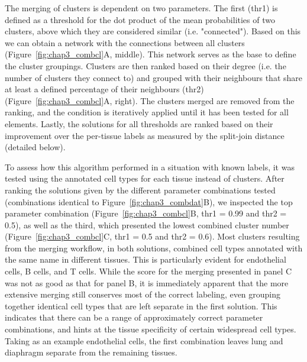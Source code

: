 The merging of clusters is dependent on two parameters. The first (thr1) is defined as a threshold for the dot product of the mean probabilities of two clusters, above which they are considered similar (i.e. "connected"). Based on this we can obtain a network with the connections between all clusters (Figure~\ref{fig:chap3_combcl}A, middle). This network serves as the base to define the cluster groupings. Clusters are then ranked based on their degree (i.e. the number of clusters they connect to) and grouped with their neighbours that share at least a defined percentage of their neighbours (thr2) (Figure~\ref{fig:chap3_combcl}A, right). The clusters merged are removed from the ranking, and the condition is iteratively applied until it has been tested for all elements. Lastly, the solutions for all thresholds are ranked based on their improvement over the per-tissue labels as measured by the split-join distance (detailed below).

To assess how this algorithm performed in a situation with known labels, it was tested using the annotated cell types for each tissue instead of clusters. After ranking the solutions given by the different parameter combinations tested (combinations identical to Figure~\ref{fig:chap3_combdat}B), we inspected the top parameter combination (Figure~\ref{fig:chap3_combcl}B, thr1 = 0.99 and thr2 = 0.5), as well as the third, which presented the lowest combined cluster number (Figure~\ref{fig:chap3_combcl}C, thr1 = 0.5 and thr2 = 0.6). Most clusters resulting from the merging workflow, in both solutions, combined cell types annotated with the same name in different tissues. This is particularly evident for endothelial cells, B cells, and T cells. While the score for the merging  presented in panel C was not as good as that for panel B, it is immediately apparent that the more extensive merging still conserves most of the correct labeling, even grouping together identical cell types that are left separate in the first solution. This indicates that there can be a range of approximately correct parameter combinations, and hints at the tissue specificity of certain widespread cell types. Taking as an example endothelial cells, the first combination leaves lung and diaphragm separate from the remaining tissues.

